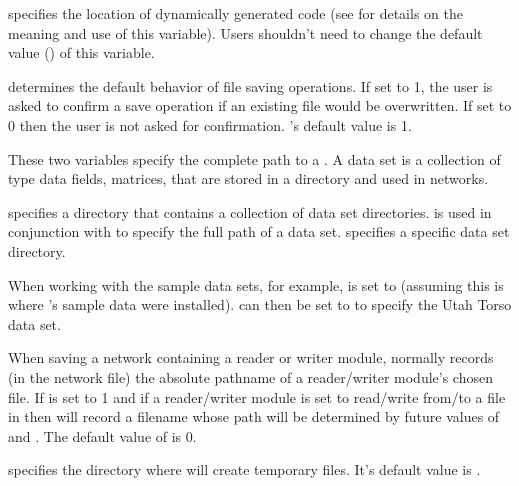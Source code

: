 \begin{description}
   specifies the location of
  dynamically generated code (see  for details on the meaning and use of
  this variable).  Users shouldn't need to change the default value
  () of this variable.
  
   determines the default behavior of
  file saving operations.  If set to 1, the user is
  asked to confirm a save operation if an existing file would be
  overwritten.  If set to 0 then the user is not asked for
  confirmation.  's default value is 1.
  
   These two
  variables specify the complete path to a \sr{} . A
  data set is a collection of \sr{} type data fields, matrices, \etc{}
  that are stored in a directory and used in \sr{} networks.

   specifies a directory that contains a
  collection of data set directories.   is used in
  conjunction with  to specify the full path of
  a data set.   specifies a specific data set
  directory. 

  When working with the sample \sr{} data sets, for example,
   is set to
   (assuming this is where \sr{}'s
  sample data were installed).   can then be
  set to  to specify the Utah Torso data set.
  
   When saving a network
  containing a reader or writer module, \sr{} normally records (in the
  network file) the absolute
  pathname of a reader/writer module's chosen file.  If
   is set to 1 and if a
  reader/writer module is set to read/write from/to a file in
   then \sr{} will record a
  filename whose path will be determined by future values of
   and .  The default
  value of  is 0.

   specifies the directory where \sr{} will
  create temporary files.  It's default value is .


\end{description}

